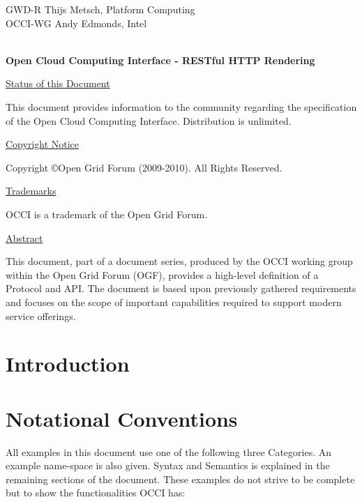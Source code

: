 \documentclass[10pt,a4paper]{article}
\begin{document}
\thispagestyle{empty}

GWD-R \hfill Thijs Metsch, Platform Computing\\
OCCI-WG \hfill Andy Edmonds, Intel\\
\\

\vspace*{0.5in}

\begin{Large}
\textbf{Open Cloud Computing Interface - RESTful HTTP Rendering}
\end{Large}

\vspace*{0.5in}

\underline{Status of this Document}

This document provides information to the community regarding the
specification of the Open Cloud Computing Interface. Distribution is
unlimited.

\underline{Copyright Notice}

Copyright \copyright Open Grid Forum (2009-2010). All Rights Reserved.

\underline{Trademarks}

OCCI is a trademark of the Open Grid Forum.

\underline{Abstract}

This document, part of a document series, produced by the OCCI working
group within the Open Grid Forum (OGF), provides a high-level
definition of a Protocol and API. The document is based upon
previously gathered requirements and focuses on the scope of important
capabilities required to support modern service offerings.

\newpage
\tableofcontents
\newpage

\section{Introduction}


\section{Notational Conventions}


All examples in this document use one of the following three
Categories. An example name-space is also given. Syntax and Semantics
is explained in the remaining sections of the document. These examples
do not strive to be complete but to show the functionalities OCCI has:
\end{document}
